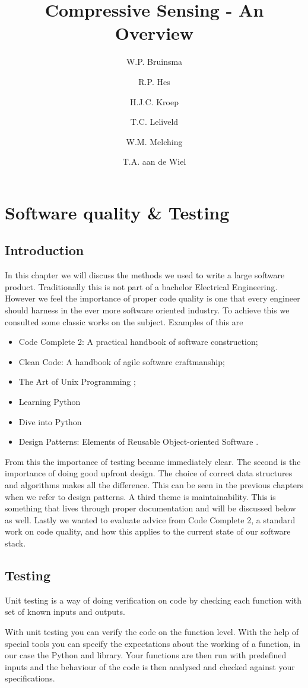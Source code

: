 \documentclass[a4paper, openany, oneside]{memoir}
\title{Compressive Sensing - An Overview}
\author{W.P. Bruinsma \and R.P. Hes \and H.J.C. Kroep \and T.C. Leliveld \and W.M. Melching \and T.A. aan de Wiel}
\begin{document}
\chapter{Software quality \& Testing}
\section{Introduction}
In this chapter we will discuss the methods we used to write a large software product. Traditionally this is not part of a bachelor Electrical Engineering. However we feel the importance of proper code quality is one that every engineer should harness in the ever more software oriented industry. To achieve this we consulted some classic works on the subject. Examples of this are
\begin{itemize}
    \item Code Complete 2: A practical handbook of software construction\cite{mcconnell2004code};
    \item Clean Code: A handbook of agile software craftmanship\cite{martin2008clean};
    \item The Art of Unix Programming \cite{raymond2003art};
    \item Learning Python %
    \item Dive into Python%
    \item Design Patterns: Elements of Reusable Object-oriented Software \cite{designpatterns}.
\end{itemize}
From this the importance of testing became immediately clear. The second is the importance of doing good upfront design. The choice of correct data structures and algorithms makes all the difference. This can be seen in the previous chapters when we refer to design patterns. A third theme is maintainability. This is something that lives through proper documentation and will be discussed below as well. Lastly we wanted to evaluate advice from Code Complete 2, a standard work on code quality, and how this applies to the current state of our software stack.

\section{Testing}
Unit testing is a way of doing verification on code by checking each function with set of known inputs and outputs.

With unit testing you can verify the code on the function level. With the help of special tools you can specify the expectations about the working of a function, in our case the Python  and  library. Your functions are then run with predefined inputs and the behaviour of the code is then analysed and checked against your specifications.
\end{document}
